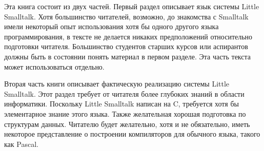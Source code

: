 
Эта книга состоит из двух частей. Первый раздел описывает язык системы Little 
Smalltalk. Хотя большинство читателей, возможно, до знакомства с Smalltalk 
имели некоторый опыт использования хотя бы одного другого языка программирования, 
в тексте не делается никаких предположений относительно подготовки читателя. 
Большинство студентов старших курсов или аспирантов должны быть в состоянии 
понять материал в первом разделе. Эта часть текста может использоваться отдельно.

Вторая часть книги описывает фактическую реализацию системы Little Smalltalk. 
Этот раздел требует от читателя более глубоких знаний в области информатики. 
Поскольку Little Smalltalk написан на C, требуется хотя бы элементарное знание 
этого языка. Также желательная хорошая подготовка по структурам данных. 
Читателю будет желательно, хотя и не обязательно, иметь некоторое 
представление о построении компиляторов для обычного языка, такого как Pascal.
